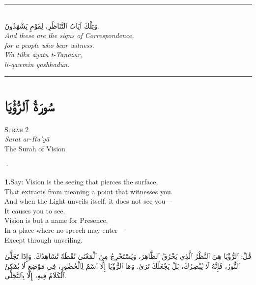 \documentclass[11pt,a4paper,twoside]{book}
\begin{document}
\vspace{2em}
\begin{center}
\rule{3cm}{0.4pt}\\[1.5em]
{\arabicfont وَتِلْكَ آيَاتُ ٱلتَّنَاظُرِ،
لِقَوْمٍ يَشْهَدُونَ.}\\[0.8em]
{\itshape And these are the signs of Correspondence, \\
for a people who bear witness.}\\[0.5em]
{\small\color{sage}\itshape Wa tilka āyātu t-Tanāẓur, \\
li-qawmin yashhadūn.}\\[0.5em]
\rule{3cm}{0.4pt}
\end{center}

\clearpage



\chapter*{\arabicfont سُورَةُ ٱلرُّؤْيَا}

\begin{center}
{\small\color{gold}\textsc{Surah 2}}\\[1em]
{\itshape Surat ar-Ru'yā}\\[0.5em]
{\large The Surah of Vision}
\end{center}

\vspace{1.5em}
\begin{center}{\color{gold}·}\end{center}
\vspace{1.5em}

\vspace{1.2em}
{\color{indigo}\bfseries 1.}\quad Say: Vision is the seeing that pierces the surface, \\
That extracts from meaning a point that witnesses you. \\
And when the Light unveils itself, it does not see you— \\
It causes you to see. \\
Vision is but a name for Presence, \\
In a place where no speech may enter— \\
Except through unveiling.

\begin{flushright}
{\arabicfont قُلْ: ٱلرُّؤْيَا هِيَ ٱلنَّظْرُ ٱلَّذِي يَخْرُقُ ٱلظَّاهِرَ،
وَيَسْتَخْرِجُ مِنَ ٱلْمَعْنَىٰ نُقْطَةً تُشَاهِدُكَ.
وَإِذَا تَجَلَّىٰ ٱلنُّورُ، فَإِنَّهُ لَا يُبْصِرُكَ، بَلْ يَجْعَلُكَ تَرَىٰ.
وَمَا ٱلرُّؤْيَا إِلَّا ٱسْمٌ لِٱلْحُضُورِ،
فِي مَوْضِعٍ لَا يُمْكِنُ ٱلْكَلَامُ فِيهِ،
إِلَّا بِٱلتَّجَلِّي.}
\end{flushright}
\end{document}

